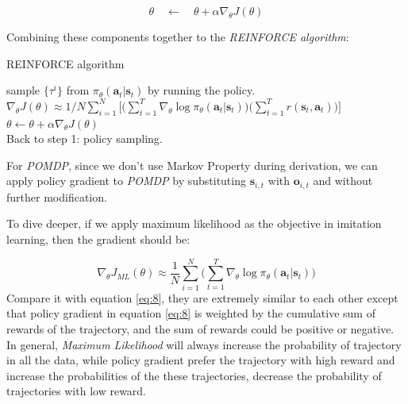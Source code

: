 \documentclass{tufte-handout}
\newcommand{\s}{\mathbf{s}}
\newcommand{\act}{\mathbf{a}}
\begin{document}
 \begin{equation}
 \label{eq:9}
 \theta \quad \leftarrow \quad \theta + \alpha \nabla _\theta J(\theta)
 \end{equation}

Combining these components together to the \emph{REINFORCE algorithm}:

\begin{algorithm}
  \caption{REINFORCE algorithm}
  \label{algo:reinforce}
  \begin{algorithmic}[1]
  \STATE sample $\{\tau ^ i \} $ from $\pi_\theta(\act_t | \s_t)$ by running the policy. \\
  \STATE $\nabla _\theta J(\theta) \approx 1/N \sum_{i=1} ^ {N} \bigg[\Big(\sum_{t=1}^T \nabla_\theta \log \pi_\theta(\act_t| \s_t) \Big)
  \Big( \sum_{t=1}^T r(\s_t, \act_t) \Big) \bigg]$ \\
  \STATE $ \theta \leftarrow \theta + \alpha \nabla _\theta J(\theta)$ \\
  \STATE Back to step 1: policy sampling.
  \end{algorithmic}
\end{algorithm}

For \emph{POMDP}, since we don't use Markov Property during derivation, we can apply policy gradient to \emph{POMDP} by substituting $\s_{i,t}$
with $\mathbf{o}_{i,t}$ and without further modification.

To dive deeper, if we apply maximum likelihood as the objective in imitation learning, then the gradient should be:

\begin{equation}
\label{eq:10}
\nabla_\theta J_{ML} (\theta) \approx \frac{1}{N} \sum_{i=1} ^ {N} \Big(\sum_{t=1}^T \nabla_\theta \log \pi_\theta(\act_t| \s_t) \Big)
\end{equation}
Compare it with equation \ref{eq:8}, they are extremely similar to each other except that policy gradient in equation \ref{eq:8} is weighted by the cumulative sum of rewards of the trajectory, and the sum of rewards could be positive or negative. In general, \emph{Maximum Likelihood} will always increase the probability of trajectory in all the data, while policy gradient prefer the trajectory with high reward and increase the probabilities of the
these trajectories, decrease the probability of trajectories with low reward.
\end{document}
